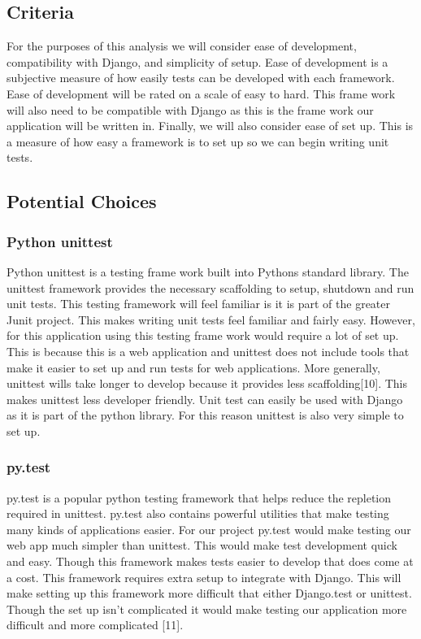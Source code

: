 \documentclass[onecolumn, draftclsnofoot,10pt, compsoc]{article}
\begin{document}
	\subsection{Criteria}
		For the purposes of this analysis we will consider ease of development, compatibility with Django, and simplicity of setup. Ease of development is a subjective measure of how easily tests can be developed with each framework. Ease of development will be rated on a scale of easy to hard. This frame work will also need to be compatible with Django as this is the frame work our application will be written in. Finally, we will also consider ease of set up. This is a measure of how easy a framework is to set up so we can begin writing unit tests.
	\subsection{Potential Choices}
		\subsubsection{Python unittest}
			Python unittest is a testing frame work built into Pythons standard library. The unittest framework provides the necessary scaffolding to setup, shutdown and run unit tests. This testing framework will feel familiar is it is part of the greater Junit project. This makes writing unit tests feel familiar and fairly easy. However, for this application using this testing frame work would require a lot of set up. This is because this is a web application and unittest does not include tools that make it easier to set up and run tests for web applications. More generally, unittest wills take longer to develop because it provides less scaffolding[10]. This makes unittest less developer friendly. Unit test can easily be used with Django as it is part of the python library. For this reason unittest is also very simple to set up.
		\subsubsection{py.test}
			py.test is a popular python testing framework that helps reduce the repletion required in unittest. py.test also contains powerful utilities that make testing many kinds of applications easier. For our project py.test would make testing our web app much simpler than unittest. This would make test development quick and easy. Though this framework makes tests easier to develop that does come at a cost. This framework requires extra setup to integrate with Django. This will make setting up this framework more difficult that either Django.test or unittest. Though the set up isn't complicated it would make testing our application more difficult and more complicated [11].
\end{document}
